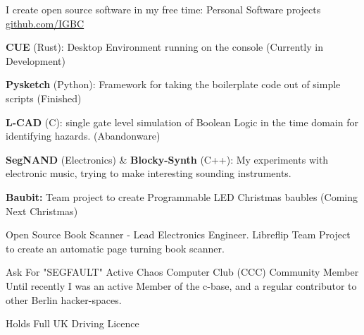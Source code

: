 \documentclass[11pt, a4paper]{awesome-cv}
\begin{document}
\begin{cventries}
  \cventry
    {I create open source software in my free time:} %
    {Personal Software projects} %
    {}{\href{https://github.com/IGBC}{github.com/IGBC}} %
    {
    \begin{cvitems} %
        \item {\textbf{CUE} (Rust): Desktop Environment running on the console (Currently in Development)}
        \item {\textbf{Pysketch} (Python): Framework for taking the boilerplate code out of simple scripts (Finished)}
        \item {\textbf{L-CAD} (C): single gate level simulation of Boolean Logic in the time domain for identifying hazards. (Abandonware)}
        \item {\textbf{SegNAND} (Electronics) \& \textbf{Blocky-Synth} (C++): My experiments with electronic music, trying to make interesting sounding instruments.}
        \item {\textbf{Baubit:} Team project to create Programmable LED Christmas baubles (Coming Next Christmas)}
      \end{cvitems} 
     }

  \cventry
    {Open Source Book Scanner - Lead Electronics Engineer.} %
    {Libreflip} %
    {}{} %
    {Team Project to create an automatic page turning book scanner.}

  \cventry
    {Ask For "SEGFAULT"} %
    {Active Chaos Computer Club (CCC) Community Member} %
    {}{} %
    {Until recently I was an active Member of the c-base, and a regular contributor to other Berlin hacker-spaces.}

  \cventry
    {} %
    {Holds Full UK Driving Licence} %
    {}{} %
    {}
\end{cventries}
\end{document}
